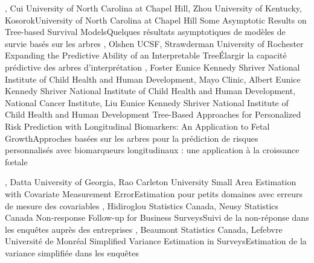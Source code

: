 {
,  {Cui}
{University of North Carolina at Chapel Hill},  {Zhou}
{University of Kentucky},  {Kosorok}{University of North Carolina at Chapel Hill}
}
{Some Asymptotic Results on Tree-based Survival Models}{Quelques résultats asymptotiques de modèles de survie basés sur les arbres}
{\bubbleE \enspace \screenE}
{
,  {Olshen}
{UCSF},  {Strawderman}
{University of Rochester}
}
{Expanding the Predictive Ability of an Interpretable Tree}{Élargir la capacité prédictive des arbres d’interprétation}
{\bubbleE \enspace \screenE}
{
,  {Foster}
{Eunice Kennedy Shriver National Institute of Child Health and Human Development, Mayo Clinic},  {Albert}
{Eunice Kennedy Shriver National Institute of Child Health and Human Development, National Cancer Institute},  {Liu}
{Eunice Kennedy Shriver National Institute of Child Health and Human Development}
}
{Tree-Based Approaches for Personalized Risk Prediction with Longitudinal Biomarkers: An Application to Fetal Growth}{Approches basées sur les arbres pour la prédiction de risques personnalisés avec biomarqueurs longitudinaux : une application à la croissance fœtale}
{\bubbleE \enspace \screenE}


{
,  {Datta}
{University of Georgia},  {Rao}
{Carleton University}
}
{Small Area Estimation with Covariate Measurement Error}{Estimation pour petits domaines avec erreurs de mesure des covariables}
{\bubbleE \enspace \screenE}
{
,  {Hidiroglou}
{Statistics Canada},  {Neusy}
{Statistics Canada}
}
{Non-response Follow-up for Business Surveys}{Suivi de la non-réponse dans les enquêtes auprès des entreprises}
{\bubbleE \enspace \screenE}
{
,  {Beaumont}
{Statistics Canada},  {Lefebvre}
{Université de Monréal}
}
{Simplified Variance Estimation in Surveys}{Estimation de la variance simplifiée dans les enquêtes}
{\bubbleE \enspace \screenE}

